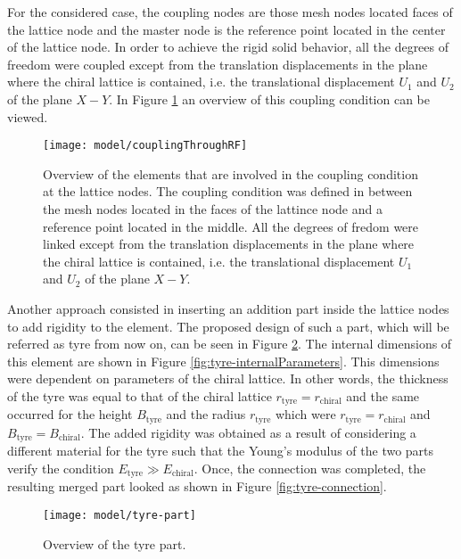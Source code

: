 For the considered case, the coupling nodes are those mesh nodes located faces of the lattice node and the master node is the reference point located in the center of the lattice node. In order to achieve the rigid solid behavior, all the degrees of freedom were coupled except from the translation displacements in the plane where the chiral lattice is contained, i.e. the translational displacement $U_1$ and $U_2$ of the plane $X-Y$. In Figure \ref{fig:couplingThroughRF} an overview of this coupling condition can be viewed.

\begin{figure}[!htpb]
  \centering
  \texttt{[image: model/couplingThroughRF]}
  \caption[Overview of the elements that are involved in the coupling condition at the lattice nodes]{Overview of the elements that are involved in the coupling condition at the lattice nodes. The coupling condition was defined in between the mesh nodes located in the faces of the lattince node and a reference point located in the middle. All the degrees of fredom were linked except from the translation displacements in the plane where the chiral lattice is contained, i.e. the translational displacement $U_1$ and $U_2$ of the plane $X-Y$.}\label{fig:couplingThroughRF}
\end{figure}

Another approach consisted in inserting an addition part inside the lattice nodes to add rigidity to the element. The proposed design of such a part, which will be referred as tyre from now on, can be seen in Figure \ref{fig:tyre-part}. The internal dimensions of this element are shown in Figure \ref{fig:tyre-internalParameters}. This dimensions were dependent on parameters of the chiral lattice. In other words, the thickness of the tyre was equal to that of the chiral lattice $r_{\mathrm{tyre}} = r_{\mathrm{chiral}}$ and the same occurred for the height $B_{\mathrm{tyre}}$ and the radius $r_{\mathrm{tyre}}$ which were $r_{\mathrm{tyre}} = r_{\mathrm{chiral}}$ and $B_{\mathrm{tyre}} = B_{\mathrm{chiral}}$. The added rigidity was obtained as a result of considering a different material for the tyre such that the Young's modulus of the two parts verify the condition $E_{\mathrm{tyre}} \gg E_{\mathrm{chiral}}$. Once, the connection was completed, the resulting merged part looked as shown in Figure \ref{fig:tyre-connection}.

\begin{figure}[!htpb]
  \centering
  \texttt{[image: model/tyre-part]}
  \caption[Overview of the tyre part]{Overview of the tyre part.}\label{fig:tyre-part}
\end{figure}

